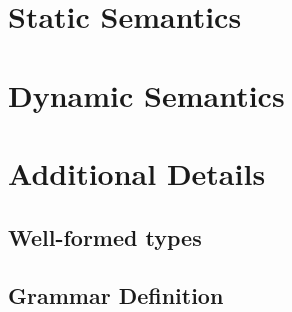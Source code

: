 \documentclass[11pt]{article}%
\begin{document}
%
%

\section{Static Semantics}
\ottdefnsTypes%

\section{Dynamic Semantics}
\ottdefnsOpXXSem%


\clearpage%


\clearpage%


\clearpage%

\section{Additional Details}

\subsection{Well-formed types}
\ottdefnsWellXXFormed%

\subsection{Grammar Definition}
\ottgrammar%

\clearpage%
\end{document}
